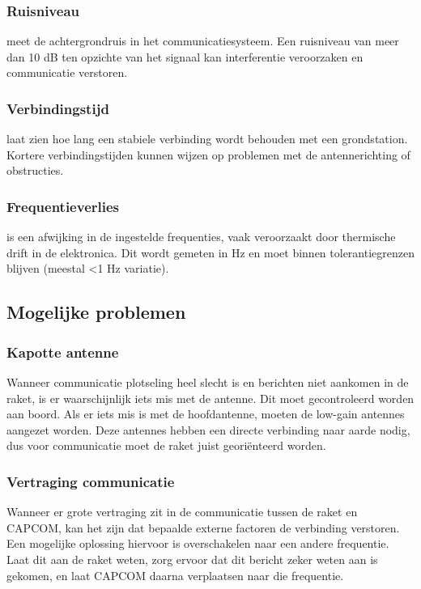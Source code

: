 \subsubsection{Ruisniveau}
meet de achtergrondruis in het communicatiesysteem. Een ruisniveau van meer dan 10 dB ten opzichte van het signaal kan interferentie veroorzaken en communicatie verstoren.

\subsubsection{Verbindingstijd}
laat zien hoe lang een stabiele verbinding wordt behouden met een grondstation. Kortere verbindingstijden kunnen wijzen op problemen met de antennerichting of obstructies.

\subsubsection{Frequentieverlies}
is een afwijking in de ingestelde frequenties, vaak veroorzaakt door thermische drift in de elektronica. Dit wordt gemeten in Hz en moet binnen tolerantiegrenzen blijven (meestal <1 Hz variatie).


\subsection{Mogelijke problemen}

\subsubsection{Kapotte antenne}
Wanneer communicatie plotseling heel slecht is en berichten niet aankomen in de raket, is er waarschijnlijk iets mis met de antenne. Dit moet gecontroleerd worden aan boord. Als er iets mis is met de hoofdantenne, moeten de low-gain antennes aangezet worden. Deze antennes hebben een directe verbinding naar aarde nodig, dus voor communicatie moet de raket juist georiënteerd worden.

\subsubsection{Vertraging communicatie}
Wanneer er grote vertraging zit in de communicatie tussen de raket en CAPCOM, kan het zijn dat bepaalde externe factoren de verbinding verstoren. Een mogelijke oplossing hiervoor is overschakelen naar een andere frequentie. Laat dit aan de raket weten, zorg ervoor dat dit bericht zeker weten aan is gekomen, en laat CAPCOM daarna verplaatsen naar die frequentie.


